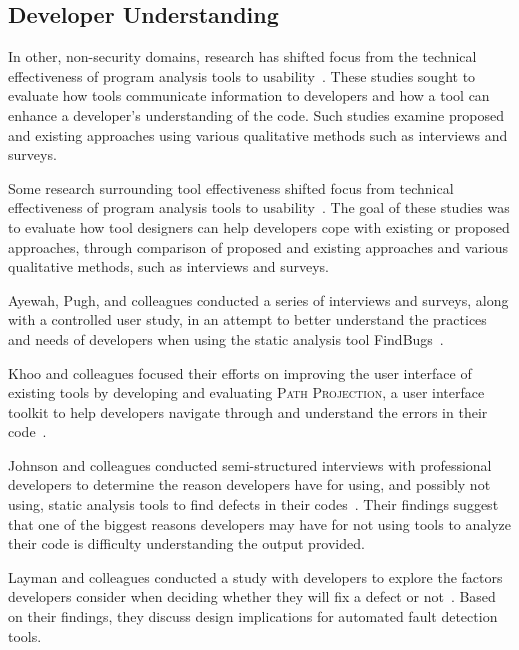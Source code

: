 \documentclass[conference]{IEEEtran}
\begin{document}
\subsection{Developer Understanding}
\label{understanding}
In other, non-security domains, research has shifted focus from the technical effectiveness of program analysis tools to usability~\cite{johnson2013don, ayewah2008using, khoo2008path}. 
These studies sought to evaluate how tools communicate information to developers and how a tool can enhance a developer's understanding of the code. Such studies examine proposed and existing approaches using various qualitative methods such as interviews and surveys. 

Some research surrounding tool effectiveness shifted focus from technical effectiveness of program analysis tools to usability~\cite{johnson2013don, ayewah2008using, khoo2008path}. The goal of these studies was to evaluate how tool designers can help developers cope with existing or proposed approaches, through comparison of proposed and existing approaches and various qualitative methods, such as interviews and surveys.

Ayewah, Pugh, and colleagues conducted a series of interviews and surveys, along with a controlled user study, in an attempt to better understand the practices and needs of developers when using the static analysis tool FindBugs~\cite{ayewah2008report, ayewah2008using}.

Khoo and colleagues focused their efforts on improving the user interface of existing tools by developing and evaluating \textsc{Path Projection}, a user interface toolkit to help developers navigate through and understand the errors in their code~\cite{khoo2008path}.

Johnson and colleagues conducted semi-structured interviews with professional developers to determine the reason developers have for using, and possibly not using, static analysis tools to find defects in their codes~\cite{johnson2013don}. 
Their findings suggest that one of the biggest reasons developers may have for not using tools to analyze their code is difficulty understanding the output provided. 

Layman and colleagues conducted a study with developers to explore the factors developers consider when deciding whether they will fix a defect or not~\cite{layman2007toward}. Based on their findings, they discuss design implications for automated fault detection tools.
\end{document}
